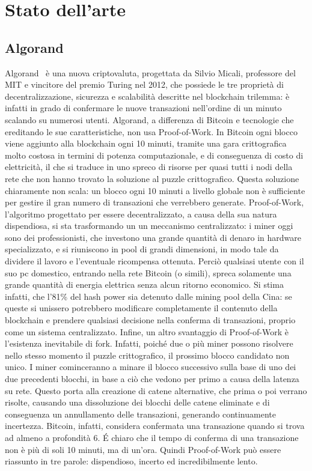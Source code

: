 \chapter{Stato dell'arte}

\section{Algorand}

Algorand~\cite{gilad2017algorand, chen2019algorand} è una nuova criptovaluta, progettata da Silvio Micali, professore del MIT e vincitore del premio Turing nel 2012, che possiede le tre proprietà di decentralizzazione, sicurezza e scalabilità descritte nel blockchain trilemma: è infatti in grado di confermare le nuove transazioni nell'ordine di un minuto scalando su numerosi utenti. Algorand, a differenza di Bitcoin e tecnologie che ereditando le sue caratteristiche, non usa Proof-of-Work. In Bitcoin ogni blocco viene aggiunto alla blockchain ogni 10 minuti, tramite una gara crittografica molto costosa in termini di potenza computazionale, e di conseguenza di costo di elettricità, il che si traduce in uno spreco di risorse per quasi tutti i nodi della rete che non hanno trovato la soluzione al puzzle crittografico. Questa soluzione chiaramente non scala: un blocco ogni 10 minuti a livello globale non è sufficiente per gestire il gran numero di transazioni che verrebbero generate.
Proof-of-Work, l'algoritmo progettato per essere decentralizzato, a causa della sua natura dispendiosa, si sta trasformando un un meccanismo centralizzato: i miner oggi sono dei professionisti, che investono una grande quantità di denaro in hardware specializzato, e si riuniscono in pool di grandi dimensioni, in modo tale da dividere il lavoro e l'eventuale ricompensa ottenuta. Perciò qualsiasi utente con il suo pc domestico, entrando nella rete Bitcoin (o simili), spreca solamente una grande quantità di energia elettrica senza alcun ritorno economico. Si stima infatti, che l'81\% del hash power sia detenuto dalle mining pool della Cina: se queste si unissero potrebbero modificare completamente il contenuto della blockchain e prendere qualsiasi decisione nella conferma di transazioni, proprio come un sistema centralizzato.
Infine, un altro svantaggio di Proof-of-Work è l'esistenza inevitabile di fork. Infatti, poiché due o più miner possono risolvere nello stesso momento il puzzle crittografico, il prossimo blocco candidato non unico. I miner cominceranno a minare il blocco successivo sulla base di uno dei due precedenti blocchi, in base a ciò che vedono per primo a causa della latenza su rete. Questo porta alla creazione di catene alternative, che prima o poi verrano risolte, causando una dissoluzione dei blocchi delle catene eliminate e di conseguenza un annullamento delle transazioni, generando continuamente incertezza. Bitcoin, infatti, considera confermata una transazione quando si trova ad almeno a profondità 6. \'E chiaro che il tempo di conferma di una transazione non è più di soli 10 minuti, ma di un'ora. Quindi Proof-of-Work può essere riassunto in tre parole: dispendioso, incerto ed incredibilmente lento.

